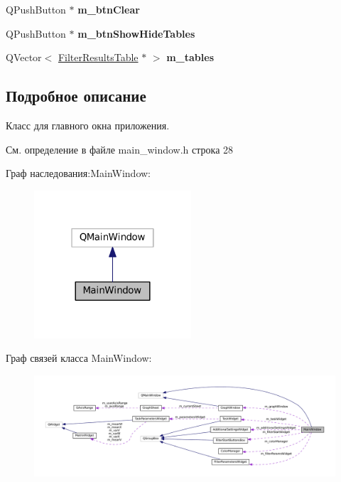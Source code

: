 \begin{DoxyCompactItemize}
\hypertarget{class_main_window_a00b995ad2a53bd276a53fc137048b278}{}\label{class_main_window_a00b995ad2a53bd276a53fc137048b278} 
Q\+Push\+Button $\ast$ {\bfseries m\+\_\+btn\+Clear}
\item 
\hypertarget{class_main_window_a3fd0f094bf729b91405b14deb7ae4c54}{}\label{class_main_window_a3fd0f094bf729b91405b14deb7ae4c54} 
Q\+Push\+Button $\ast$ {\bfseries m\+\_\+btn\+Show\+Hide\+Tables}
\item 
\hypertarget{class_main_window_aab37e47932ec4fc5002724bdef5f959b}{}\label{class_main_window_aab37e47932ec4fc5002724bdef5f959b} 
Q\+Vector$<$ \hyperlink{class_filter_results_table}{Filter\+Results\+Table} $\ast$ $>$ {\bfseries m\+\_\+tables}
\end{DoxyCompactItemize}


\subsection{Подробное описание}
Класс для главного окна приложения. 

См. определение в файле main\+\_\+window.\+h строка 28



Граф наследования\+:Main\+Window\+:\nopagebreak
\begin{figure}[H]
\begin{center}
\leavevmode
\includegraphics[width=166pt]{class_main_window__inherit__graph}
\end{center}
\end{figure}


Граф связей класса Main\+Window\+:\nopagebreak
\begin{figure}[H]
\begin{center}
\leavevmode
\includegraphics[width=350pt]{class_main_window__coll__graph}
\end{center}
\end{figure}



